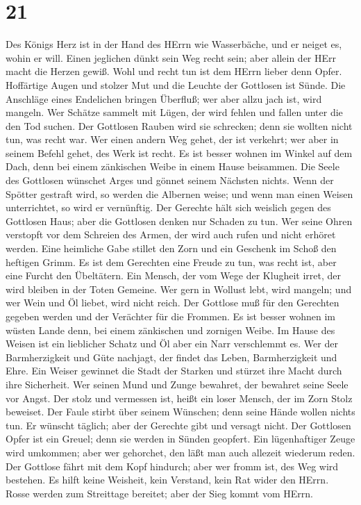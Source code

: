 \hypertarget{section-20}{%
\section{21}\label{section-20}}

 Des Königs Herz ist in der Hand des HErrn wie Wasserbäche,
und er neiget es, wohin er will.  Einen jeglichen dünkt sein
Weg recht sein; aber allein der HErr macht die Herzen gewiß.
 Wohl und recht tun ist dem HErrn lieber denn Opfer.
 Hoffärtige Augen und stolzer Mut und die Leuchte der
Gottlosen ist Sünde.  Die Anschläge eines Endelichen bringen
Überfluß; wer aber allzu jach ist, wird mangeln.  Wer
Schätze sammelt mit Lügen, der wird fehlen und fallen unter die den Tod
suchen.  Der Gottlosen Rauben wird sie schrecken; denn sie
wollten nicht tun, was recht war.  Wer einen andern Weg
gehet, der ist verkehrt; wer aber in seinem Befehl gehet, des Werk ist
recht.  Es ist besser wohnen im Winkel auf dem Dach, denn
bei einem zänkischen Weibe in einem Hause beisammen.  Die
Seele des Gottlosen wünschet Arges und gönnet seinem Nächsten nichts.
 Wenn der Spötter gestraft wird, so werden die Albernen
weise; und wenn man einen Weisen unterrichtet, so wird er vernünftig.
 Der Gerechte hält sich weislich gegen des Gottlosen Haus;
aber die Gottlosen denken nur Schaden zu tun.  Wer seine
Ohren verstopft vor dem Schreien des Armen, der wird auch rufen und
nicht erhöret werden.  Eine heimliche Gabe stillet den Zorn
und ein Geschenk im Schoß den heftigen Grimm.  Es ist dem
Gerechten eine Freude zu tun, was recht ist, aber eine Furcht den
Übeltätern.  Ein Mensch, der vom Wege der Klugheit irret,
der wird bleiben in der Toten Gemeine.  Wer gern in Wollust
lebt, wird mangeln; und wer Wein und Öl liebet, wird nicht reich.
 Der Gottlose muß für den Gerechten gegeben werden und der
Verächter für die Frommen.  Es ist besser wohnen im wüsten
Lande denn, bei einem zänkischen und zornigen Weibe.  Im
Hause des Weisen ist ein lieblicher Schatz und Öl aber ein Narr
verschlemmt es.  Wer der Barmherzigkeit und Güte nachjagt,
der findet das Leben, Barmherzigkeit und Ehre.  Ein Weiser
gewinnet die Stadt der Starken und stürzet ihre Macht durch ihre
Sicherheit.  Wer seinen Mund und Zunge bewahret, der
bewahret seine Seele vor Angst.  Der stolz und vermessen
ist, heißt ein loser Mensch, der im Zorn Stolz beweiset. 
Der Faule stirbt über seinem Wünschen; denn seine Hände wollen nichts
tun.  Er wünscht täglich; aber der Gerechte gibt und
versagt nicht.  Der Gottlosen Opfer ist ein Greuel; denn
sie werden in Sünden geopfert.  Ein lügenhaftiger Zeuge
wird umkommen; aber wer gehorchet, den läßt man auch allezeit wiederum
reden.  Der Gottlose fährt mit dem Kopf hindurch; aber wer
fromm ist, des Weg wird bestehen.  Es hilft keine Weisheit,
kein Verstand, kein Rat wider den HErrn.  Rosse werden zum
Streittage bereitet; aber der Sieg kommt vom HErrn.

